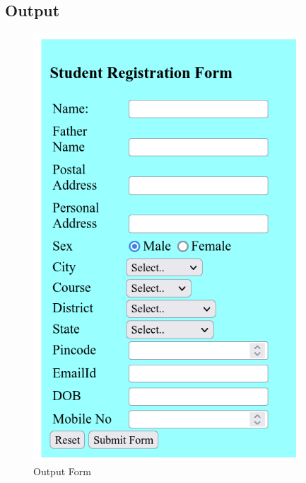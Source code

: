 \documentclass{article}
\begin{document}
\subsection*{Output}
\begin{figure}[H]
    \caption{Output Form}
    \centering
    \includegraphics[width=10cm]{1/out.png}
\end{figure}
\end{document}

